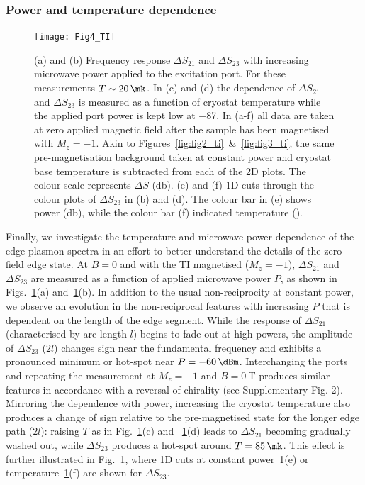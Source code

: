 \subsubsection{Power and temperature dependence}
\begin{figure}
\texttt{[image: Fig4\_TI]}
\caption[Effect of temperature and microwave power]{\label{fig:fig4_ti}(a) and (b) Frequency response $\Delta S_{21}$ and $\Delta S_{23}$ with increasing microwave power applied to the excitation port. For these measurements $T \sim \SI{20}{\mk}$. In (c) and (d) the dependence of $\Delta S_{21}$ and $\Delta S_{23}$ is measured as a function of cryostat temperature while the applied port power is kept low at \SI{-87}{\dBm}. In (a-f)  all data are taken at zero applied magnetic field after the sample has been magnetised with $M_z=-1$. Akin to Figures~\ref{fig:fig2_ti}~\&~\ref{fig:fig3_ti}, the same pre-magnetisation background taken at constant power and cryostat base temperature is subtracted from each of the 2D plots. The colour scale represents $\Delta S$ (\si{\decibel}). (e) and (f) 1D cuts through the colour plots of $\Delta S_{23}$ in (b) and (d). The colour bar in (e) shows power (\si{\decibel}), while the colour bar (f) indicated temperature (\si{\mk}).}
\end{figure}
Finally, we investigate the temperature and microwave power dependence of the edge plasmon spectra in an effort to better understand the details of the zero-field edge state.  At $B=0$ and with the TI magnetised ($M_z=-1$), $\Delta S_{21}$ and $\Delta S_{23}$ are measured as a function of applied microwave power $P$, as shown in Figs.~\ref{fig:fig4_ti}(a) and~\ref{fig:fig4_ti}(b). In addition to the usual non-reciprocity at constant power, we observe an evolution in the non-reciprocal features with increasing $P$ that is dependent on the length of the edge segment. While the response of $\Delta S_{21}$ (characterised by arc length $l$) begins to fade out at high powers, the amplitude of $\Delta S_{23}$ ($2l$) changes sign near the fundamental frequency and exhibits a pronounced minimum or hot-spot near $P = \SI{-60}{\dBm}$. Interchanging the ports and repeating the measurement at $M_z=+1$ and $B=\SI{0}{\tesla}$ produces similar features in accordance with a reversal of chirality (see Supplementary Fig. 2). Mirroring the dependence with power, increasing the cryostat temperature also produces a change of sign relative to the pre-magnetised state for the longer edge path ($2l$): raising $T$ as in Fig.~\ref{fig:fig4_ti}(c) and ~\ref{fig:fig4_ti}(d) leads to $\Delta S_{21}$ becoming gradually washed out, while $\Delta S_{23}$ produces a hot-spot around $T = \SI{85}{\mk}$. This effect is further illustrated in Fig.~\ref{fig:fig4_ti}, where 1D cuts at constant power~\ref{fig:fig4_ti}(e) or temperature~\ref{fig:fig4_ti}(f) are shown for $\Delta S_{23}$.


